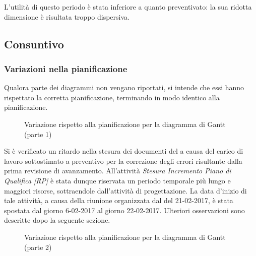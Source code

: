 L'utilità di questo periodo è stata inferiore a quanto preventivato: la sua ridotta dimensione è risultata troppo dispersiva.

\subsection{Consuntivo \PA}
\introconsuntivo{\PA}

\subsubsection{Variazioni nella pianificazione}

Qualora parte dei diagrammi non vengano riportati, si intende che essi hanno rispettato la corretta pianificazione, terminando in modo identico alla pianificazione.

\begin{figure}[H]
\label{tab:cgen1}

\caption{Variazione rispetto alla pianificazione per la \PA{} diagramma di Gantt (parte 1)}
\end{figure}

Si è verificato un ritardo nella stesura dei documenti del \PdQ{} a causa del carico di lavoro sottostimato a preventivo per la correzione degli errori risultante dalla prima revisione di avanzamento. All'attività \emph{Stesura Incremento Piano di Qualifica [RP]} è stata dunque riservata un periodo temporale più lungo e maggiori risorse, sottraendole dall'attività di progettazione. La data d'inizio di tale attività, a causa della riunione organizzata dal \TV{} del 21-02-2017, è stata spostata dal giorno 6-02-2017 al giorno 22-02-2017. Ulteriori osservazioni sono descritte dopo la seguente sezione.


\begin{figure}[H]
\label{tab:cgen1}

\caption{Variazione rispetto alla pianificazione per la \PA{} diagramma di Gantt (parte 2)}
\end{figure}

